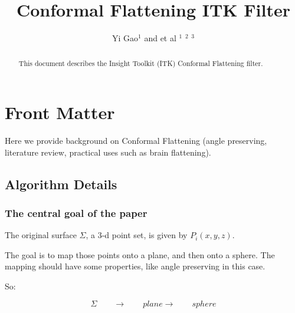 \documentclass{InsightArticle}
\title{Conformal Flattening ITK Filter}
\author{Yi Gao$^{1}$ and et al $^{1}$ $^{2}$ $^{3}$}
\begin{document}
\newif\ifpdf
\ifx\pdfoutput\undefined
  \pdffalse
\else
  \pdftrue
\fi


\ifpdf
\else
   \DeclareGraphicsExtensions{.eps,.jpg,.gif,.tiff,.bmp,.png}
   \DeclareGraphicsRule{.jpg}{eps}{.jpg.bb}{`convert #1 eps:-}
   \DeclareGraphicsRule{.gif}{eps}{.gif.bb}{`convert #1 eps:-}
   \DeclareGraphicsRule{.tiff}{eps}{.tiff.bb}{`convert #1 eps:-}
   \DeclareGraphicsRule{.bmp}{eps}{.bmp.bb}{`convert #1 eps:-}
   \DeclareGraphicsRule{.png}{eps}{.png.bb}{`convert #1 eps:-}
\fi


\maketitle


\ifhtml
\chapter*{Front Matter\label{front}}
\fi


\begin{abstract}
\noindent This document describes the Insight Toolkit (ITK)
Conformal Flattening filter.
\end{abstract}

\tableofcontents

Here we provide background on Conformal Flattening (angle
preserving, literature review, practical uses such as brain
flattening).

\section{Algorithm Details}

\subsection{The central goal of the paper}
  The original surface $\Sigma$, a 3-d point set, is given by $P_i(x,
  y, z)$.

  The goal is to map those points onto a plane, and then onto a
  sphere.  The mapping should have some properties, like angle
  preserving in this case.

  So:

  \begin{displaymath}
    \Sigma \qquad \rightarrow \qquad plane \rightarrow  \qquad sphere
  \end{displaymath}
\end{document}
